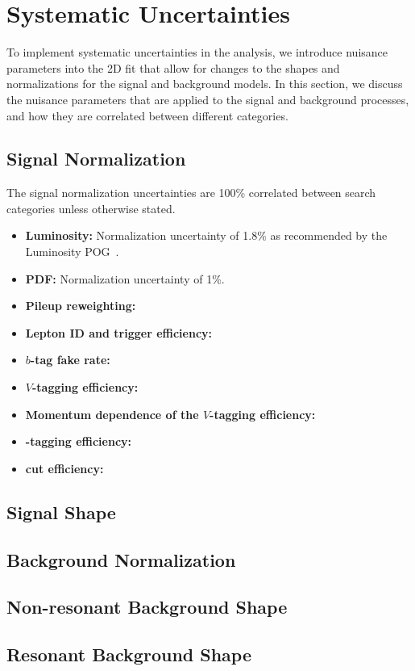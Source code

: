 
\section{Systematic Uncertainties}
\label{sec:uncert}

To implement systematic uncertainties in the analysis, we introduce nuisance parameters into the 2D fit that allow for changes to the shapes and normalizations for the signal and background models.
In this section, we discuss the nuisance parameters that are applied to the signal and background processes, and how they are correlated between different categories.

\subsection{Signal Normalization}

The signal normalization uncertainties are 100\% correlated between search categories unless otherwise stated.
\begin{itemize}
  \item {\bfseries Luminosity:} Normalization uncertainty of 1.8\% as recommended by the Luminosity POG~\cite{LumiPOG}.
  \item {\bfseries PDF:} Normalization uncertainty of 1\%.
  \item {\bfseries Pileup reweighting:}
  \item {\bfseries Lepton ID and trigger efficiency:}
  \item {\bfseries $b$-tag fake rate:}
  \item {\bfseries $V$-tagging efficiency:}
  \item {\bfseries Momentum dependence of the $V$-tagging efficiency:}
  \item {\bfseries \bbbar-tagging efficiency:}
  \item {\bfseries \Dy cut efficiency:}
\end{itemize}

\subsection{Signal Shape}

\subsection{Background Normalization}

\subsection{Non-resonant Background Shape}

\subsection{Resonant Background Shape}
